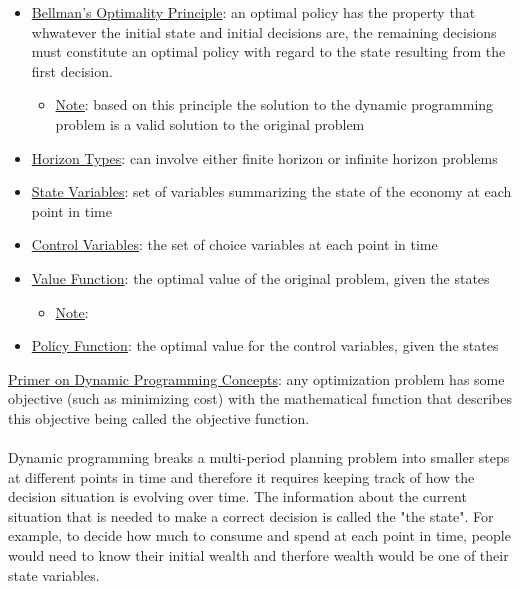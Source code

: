 \documentclass{article}
\begin{document}
\begin{itemize}
    \item \underline{Bellman's Optimality Principle}: an optimal policy has the property that whwatever the initial state and initial decisions are, the remaining decisions must constitute an optimal policy with regard to the state resulting from the first decision.
    \begin{itemize}
        \item \underline{Note}: based on this principle the solution to the dynamic programming problem is a valid solution to the original problem
    \end{itemize}
    \item  \underline{Horizon Types}: can involve either finite horizon or infinite horizon problems
    \item  \underline{State Variables}: set of variables summarizing the state of the economy at each point in time
    \item  \underline{Control Variables}: the set of choice variables at each point in time
    \item  \underline{Value Function}: the optimal value of the original problem, given the states
    \begin{itemize}
        \item \underline{Note}:
    \end{itemize}
    \item  \underline{Policy Function}: the optimal value for the control variables, given the states
\end{itemize}
\vspace{2.5mm}
\par \underline{Primer on Dynamic Programming Concepts}: any optimization problem has some objective (such as minimizing cost) with the mathematical function that describes this objective being called the objective function. \\ \\
Dynamic programming breaks a multi-period planning problem into smaller steps at different points in time and therefore it requires keeping track of how the decision situation is evolving over time. The information about the current situation that is needed to make a correct decision is called the "the state". For example, to decide how much to consume and spend at each point in time, people would need to know their initial wealth and therfore wealth would be one of their state variables.\\ \\
\end{document}
